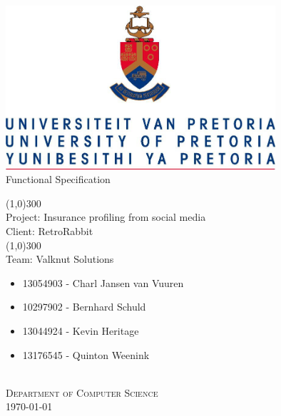 \documentclass{article}
\begin{document}
	\begin{titlepage}
		\begin{center}
			\includegraphics[width=10cm]{images/UP.jpg}  \\
			[0.5cm]
			\huge{
			Functional Specification\\
			}

			\line(1,0){300}\\
			[0.2cm]
			\LARGE{Project: Insurance profiling from social media\\
			Client: RetroRabbit} \\
			\line(1,0){300}\\
			\LARGE{Team: Valknut Solutions}\\
			[1.0cm]
			\large
			{
			\begin{itemize}
				\item 13054903 - Charl Jansen van Vuuren
				\item 10297902 - Bernhard Schuld
				\item 13044924 - Kevin Heritage
				\item 13176545 - Quinton Weenink\\
			\end{itemize}
			}
			\textsc{\large}\\
		[3.0cm]
		\textsc{\large  Department of Computer Science}\\
		[0.5cm]
		\textsc{\large \today}\\
		\end{center}


	\end{titlepage}
	\cleardoublepage
	\tableofcontents
	\cleardoublepage
	\begin{versionhistory}
	\end{versionhistory}	
\end{document}
